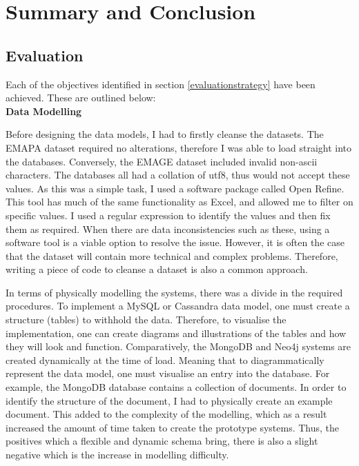 \chapter{Summary and Conclusion}\label{conclusion}
\section{Evaluation}\label{evaluation}
Each of the objectives identified in section \ref{evaluationstrategy} have been achieved. These are outlined below:\\[0.5em]

\textbf{Data Modelling}
\begin{addmargin}[2em]{0pt}
Before designing the data models, I had to firstly cleanse the datasets. The EMAPA dataset required no alterations, therefore I was able to load straight into the databases. Conversely, the EMAGE dataset included invalid non-ascii characters. The databases all had a collation of utf8, thus would not accept these values. As this was a simple task, I used a software package called Open Refine. This tool has much of the same functionality as Excel, and allowed me to filter on specific values. I used a regular expression to identify the values and then fix them as required. When there are data inconsistencies such as these, using a software tool is a viable option to resolve the issue. However, it is often the case that the dataset will contain more technical and complex problems. Therefore, writing a piece of code to cleanse a dataset is also a common approach.

In terms of physically modelling the systems, there was a divide in the required procedures. To implement a MySQL or Cassandra data model, one must create a structure (tables) to withhold the data. Therefore, to visualise the implementation, one can create diagrams and illustrations of the tables and how they will look and function. Comparatively, the MongoDB and Neo4j systems are created dynamically at the time of load. Meaning that to diagrammatically represent the data model, one must visualise an entry into the database. For example, the MongoDB database contains a collection of documents. In order to identify the structure of the document, I had to physically create an example document. This added to the complexity of the modelling, which as a result increased the amount of time taken to create the prototype systems. Thus, the positives which a flexible and dynamic schema bring, there is also a slight negative which is the increase in modelling difficulty.\\[0.5em]
\end{addmargin}

